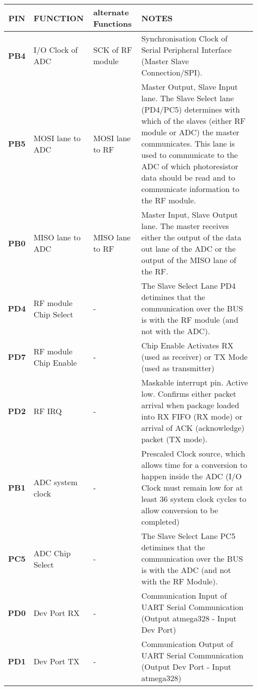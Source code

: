 \documentclass[12pt]{article}
\begin{document}
\small
\begin{tabular}{| c || p{30mm} | p{30mm} | p{60mm} |}
  \hline
  \textbf{PIN} & FUNCTION & alternate Functions & NOTES\\
  \hline
  \hline
  \textbf{PB4} & I/O Clock of ADC & SCK of RF module & Synchronisation Clock of Serial Peripheral Interface (Master Slave Connection/SPI).\\
  \hline
  \textbf{PB5} & MOSI lane to ADC & MOSI lane to RF & Master Output, Slave Input lane. The Slave Select lane (PD4/PC5) determines with which of the slaves (either RF module or ADC) the master communicates. This lane is used to communicate to the ADC of which photoresistor data should be read and to communicate information to the RF module.\\
  \hline
  \textbf{PB0} & MISO lane to ADC & MISO lane to RF & Master Input, Slave Output lane. The master receives either the output of the data out lane of the ADC or the output of the MISO lane of the RF.\\
  \hline
  \textbf{PD4} & RF module Chip Select & - & The Slave Select Lane PD4 detimines that the communication over the BUS is with the RF module (and not with the ADC).\\
  \hline
  \textbf{PD7} & RF module Chip Enable & - & Chip Enable Activates RX (used as receiver) or TX Mode (used as transmitter)\\
  \hline
  \textbf{PD2} & RF IRQ & - & Maskable interrupt pin. Active low. Confirms either packet arrival when package loaded into RX FIFO (RX mode) or arrival of ACK (acknowledge) packet (TX mode).\\
  \hline
  \textbf{PB1} & ADC system clock & - & Prescaled Clock source, which allows time for a conversion to happen inside the ADC (I/O Clock must remain low for at least 36 system clock cycles to allow conversion to be completed)\\
  \hline
  \textbf{PC5} & ADC Chip Select & - & The Slave Select Lane PC5 detimines that the communication over the BUS is with the ADC (and not with the RF Module).\\
  \hline
  \textbf{PD0} & Dev Port RX & - & Communication Input of UART Serial Communication (Output atmega328 - Input Dev Port)\\
  \hline
  \textbf{PD1} & Dev Port TX & - & Communication Output of UART Serial Communication (Output Dev Port - Input atmega328)\\
  \hline
\end{tabular}
\normalsize
\end{document}
